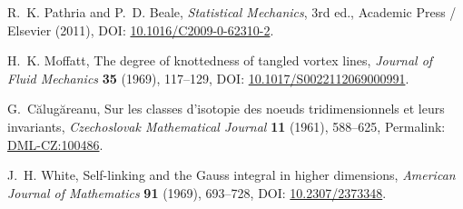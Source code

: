 R.~K. Pathria and P.~D. Beale,
\newblock \emph{Statistical Mechanics}, 3rd ed.,
\newblock Academic Press / Elsevier (2011),
\newblock DOI: \href{https://doi.org/10.1016/C2009-0-62310-2}{10.1016/C2009-0-62310-2}.

H.~K. Moffatt,
\newblock The degree of knottedness of tangled vortex lines,
\newblock \emph{Journal of Fluid Mechanics} \textbf{35} (1969), 117--129,
\newblock DOI: \href{https://doi.org/10.1017/S0022112069000991}{10.1017/S0022112069000991}.

G.~C\u{a}lug\u{a}reanu,
\newblock Sur les classes d'isotopie des noeuds tridimensionnels et leurs invariants,
\newblock \emph{Czechoslovak Mathematical Journal} \textbf{11} (1961), 588--625,
\newblock Permalink: \href{https://dml.cz/handle/10338.dmlcz/100486}{DML-CZ:100486}.

J.~H. White,
\newblock Self-linking and the Gauss integral in higher dimensions,
\newblock \emph{American Journal of Mathematics} \textbf{91} (1969), 693--728,
\newblock DOI: \href{https://doi.org/10.2307/2373348}{10.2307/2373348}.
